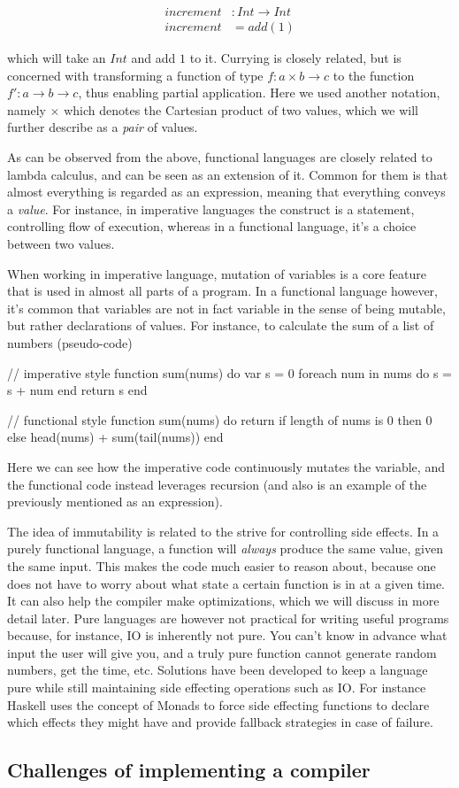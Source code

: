 \begin{align*}
increment &: Int \to Int\\
increment &= add(1)
\end{align*}

which will take an $Int$ and add $1$ to it. Currying is closely related, but is concerned with transforming a function of type $f : a \times b \to c$ to the function $f' : a \to b \to c$, thus enabling partial application. Here we used another notation, namely $\times$ which denotes the Cartesian product of two values, which we will further describe as a \emph{pair} of values.

As can be observed from the above, functional languages are closely related to lambda calculus, and can be seen as an extension of it. Common for them is that almost everything is regarded as an expression, meaning that everything conveys a \emph{value}. For instance, in imperative languages the  construct is a statement, controlling flow of execution, whereas in a functional language, it's a choice between two values.

When working in imperative language, mutation of variables is a core feature that is used in almost all parts of a program. In a functional language however, it's common that variables are not in fact variable in the sense of being mutable, but rather declarations of values. For instance, to calculate the sum of a list of numbers (pseudo-code)

\begin{pseudo}

// imperative style
function sum(nums) do
  var s = 0
  foreach num in nums do
    s = s + num
  end
  return s
end

// functional style
function sum(nums) do
  return if length of nums is 0
    then 0
    else head(nums) + sum(tail(nums))
end
\end{pseudo}

Here we can see how the imperative code continuously mutates the  variable, and the functional code instead leverages recursion (and also is an example of the previously mentioned  as an expression).

The idea of immutability is related to the strive for controlling side effects. In a purely functional language, a function will \emph{always} produce the same value, given the same input. This makes the code much easier to reason about, because one does not have to worry about what state a certain function is in at a given time. It can also help the compiler make optimizations, which we will discuss in more detail later. Pure languages are however not practical for writing useful programs because, for instance, IO is inherently not pure. You can't know in advance what input the user will give you, and a truly pure function cannot generate random numbers, get the time, etc. Solutions have been developed to keep a language pure while still maintaining side effecting operations such as IO. For instance Haskell uses the concept of Monads to force side effecting functions to declare which effects they might have and provide fallback strategies in case of failure.


\subsection{Challenges of implementing a compiler}




